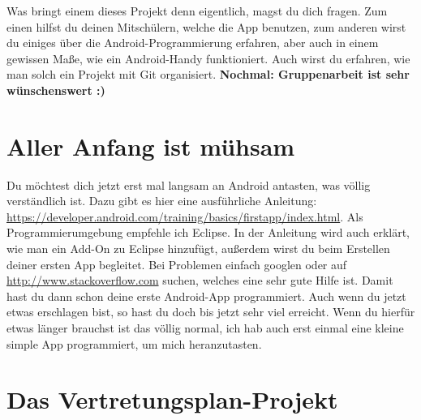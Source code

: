 \documentclass[12pt,headsepline]{scrartcl}
\begin{document}
Was bringt einem dieses Projekt denn eigentlich, magst du dich fragen. Zum einen hilfst du deinen Mitschülern, welche die App benutzen, zum anderen wirst du einiges über die Android-Programmierung erfahren, aber auch in einem gewissen Maße, wie ein Android-Handy funktioniert. Auch wirst du erfahren, wie man solch ein Projekt mit Git organisiert.
\newline
\textbf{Nochmal: Gruppenarbeit ist sehr wünschenswert :)}
\newpage
\section{Aller Anfang ist mühsam}

Du möchtest dich jetzt erst mal langsam an Android antasten, was völlig verständlich ist. Dazu gibt es hier eine ausführliche Anleitung: \url{https://developer.android.com/training/basics/firstapp/index.html}. Als Programmierumgebung empfehle ich \linebreak Eclipse. In der Anleitung wird auch erklärt, wie man ein Add-On zu Eclipse hinzufügt, außerdem wirst du beim Erstellen deiner ersten App begleitet. Bei Problemen einfach googlen oder auf \url{http://www.stackoverflow.com} suchen, welches eine sehr gute Hilfe ist.
Damit hast du dann schon deine erste Android-App programmiert. Auch wenn du jetzt etwas erschlagen bist, so hast du doch bis jetzt sehr viel erreicht. Wenn du hierfür etwas länger brauchst ist das völlig normal, ich hab auch erst einmal eine kleine simple App programmiert, um mich heranzutasten.

\section{Das Vertretungsplan-Projekt}
\end{document}
